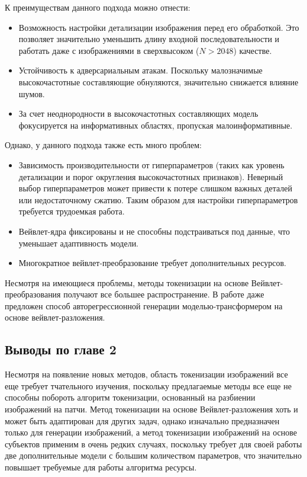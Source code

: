 К преимуществам данного подхода можно отнести:

\begin{itemize}
    \item Возможность настройки детализации изображения перед его обработкой. Это позволяет значительно уменьшить длину входной последовательности и работать даже с изображениями в сверхвысоком ($N > 2048$) качестве.
    \item Устойчивость к адверсариальным атакам. Поскольку малозначимые высокочастотные составляющие обнуляются, значительно снижается влияние шумов.
    \item За счет неоднородности в высокочастотных составляющих модель фокусируется на информативных областях, пропуская малоинформативные.
\end{itemize}

Однако, у данного подхода также есть много проблем:

\begin{itemize}
    \item Зависимость производительности от гиперпараметров (таких как уровень детализации и порог округления высокочастотных признаков). Неверный выбор гиперпараметров может привести к потере слишком важных деталей или недостаточному сжатию. Таким образом для настройки гиперпараметров требуется трудоемкая работа.
    \item Вейвлет-ядра фиксированы и не способны подстраиваться под данные, что уменьшает адаптивность модели.
    \item Многократное вейвлет-преобразование требует дополнительных ресурсов.
\end{itemize}

Несмотря на имеющиеся проблемы, методы токенизации на основе Вейвлет-преобразования получают все большее распространение. В работе \cite{wavelet_autoregression} даже предложен способ авторегрессионной генерации моделью-трансформером на основе вейвлет-разложения. 

\subsection{Выводы по главе 2}
Несмотря на появление новых методов, область токенизации изображений все еще требует тчательного изучения, поскольку предлагаемые методы все еще не способны побороть алгоритм токенизации, основанный на разбиении изображений на патчи. Метод токенизации на основе Вейвлет-разложения хоть и может быть адаптирован для других задач, однако изначально предназначен только для генерации изображений, а метод токенизации изображений на основе субъектов применим в очень редких случаях, поскольку требует для своей работы две дополнительные модели с большим количеством параметров, что значительно повышает требуемые для работы алгоритма ресурсы. 
